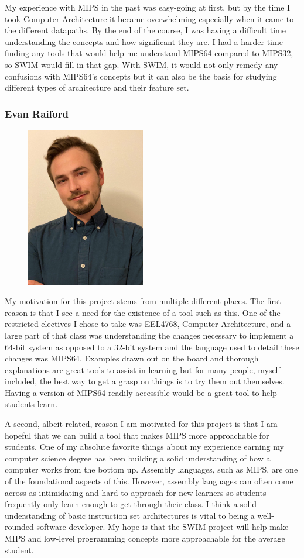 \documentclass[
    paper=letter,
    parskip=half,
    fontsize=12pt,
    titlepage=firstiscover,
    toc=bibliography,
    numbers=endperiod
]{scrartcl}
\begin{document}
My experience with MIPS in the past was easy-going at first, but by the
time I took Computer Architecture it became overwhelming especially when
it came to the different datapaths. By the end of the course, I was
having a difficult time understanding the concepts and how significant
they are. I had a harder time finding any tools that would help me
understand MIPS64 compared to MIPS32, so SWIM would fill in that gap.
With SWIM, it would not only remedy any confusions with MIPS64's
concepts but it can also be the basis for studying different types of
architecture and their feature set.

\subsubsection{Evan Raiford}
\begin{figure}[H]
    \includegraphics[height=7cm]{profile-evan}
\end{figure}

My motivation for this project stems from multiple different places. The
first reason is that I see a need for the existence of a tool such as
this. One of the restricted electives I chose to take was EEL4768,
Computer Architecture, and a large part of that class was understanding
the changes necessary to implement a 64-bit system as opposed to a
32-bit system and the language used to detail these changes was MIPS64.
Examples drawn out on the board and thorough explanations are great
tools to assist in learning but for many people, myself included, the
best way to get a grasp on things is to try them out themselves. Having
a version of MIPS64 readily accessible would be a great tool to help
students learn.

A second, albeit related, reason I am motivated for this project is that
I am hopeful that we can build a tool that makes MIPS more approachable
for students. One of my absolute favorite things about my experience
earning my computer science degree has been building a solid
understanding of how a computer works from the bottom up. Assembly
languages, such as MIPS, are one of the foundational aspects of this.
However, assembly languages can often come across as intimidating and
hard to approach for new learners so students frequently only learn
enough to get through their class. I think a solid understanding of
basic instruction set architectures is vital to being a well-rounded
software developer. My hope is that the SWIM project will help make MIPS
and low-level programming concepts more approachable for the average
student.
\end{document}
